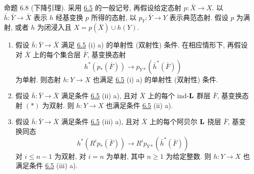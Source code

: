 \begin{enonce*}{命题 6.8}
(下降引理). 采用 \hyperref[XII.prop6.5]{6.5} 的一般记号, 再假设给定态射 $p:\bar{X}\rightarrow X$. 以 $\bar{h}:\bar{Y}\rightarrow\bar{X}$ 表示 $h$ 经基变换 $p$ 所得的态射, 以 $p_Y:\bar{Y}\rightarrow Y$ 表示典范态射. 假设 $p$ 为满射, 或者 $h$ 为闭浸入且 $X=p(\bar{X})\cup h(Y)$.
\begin{enumerate}
\renewcommand{\theenumi}{\roman{enumi}}
\renewcommand{\labelenumi}{(\theenumi)}
\item 假设 $\bar{h}:\bar{Y}\rightarrow\bar{X}$ 满足 \hyperref[XII.prop6.5]{6.5} {\rm(i) a)} 的单射性 (\resp 双射性) 条件. 在相应情形下, 再假设对 $\bar{X}$ 上的每个集合层 $\bar{F}$, 基变换态射
\begin{equation*}
h^{\ast}(p_{\ast}(\bar{F}))\longrightarrow
p_{Y\ast}(\bar{h}^{\ast}(\bar{F}))\tag{$\ast$}
\end{equation*}
为单射. 则态射 $h:Y\rightarrow X$ 也满足 \hyperref[XII.prop6.5]{6.5} {\rm(i) a)} 的单射性 (\resp 双射性) 条件.

\item 假设 $\bar{h}:\bar{Y}\rightarrow\bar{X}$ 满足条件 \hyperref[XII.prop6.5]{6.5} {\rm(ii) a)}, 且对 $\bar{X}$ 上的每个 ind-$\mathbf{L}$ 群层 $\bar{F}$, 基变换态射 $(\ast)$ 为双射. 则 $h:Y\rightarrow X$ 也满足条件 \hyperref[XII.prop6.5]{6.5} {\rm(ii) a)}.

\item 假设 $\bar{h}:\bar{Y}\rightarrow\bar{X}$ 满足条件 \hyperref[XII.prop6.5]{6.5} {\rm(iii) a)}, 且对 $\bar{X}$ 上的每个阿贝尔 $\mathbf{L}$ 挠层 $\bar{F}$, 基变换同态
$$
h^{\ast}(R^{i}p_{\ast}(\bar{F}))\longrightarrow
R^{i}p_{Y\ast}(\bar{h}^{\ast}(\bar{F}))
$$
对 $i\leq n-1$ 为双射, 对 $i=n$ 为单射, 其中 $n\geq1$ 为给定整数. 则 $h:Y\rightarrow X$ 也满足条件 \hyperref[XII.prop6.5]{6.5} {\rm(iii) a)}.
\end{enumerate}
\end{enonce*}

